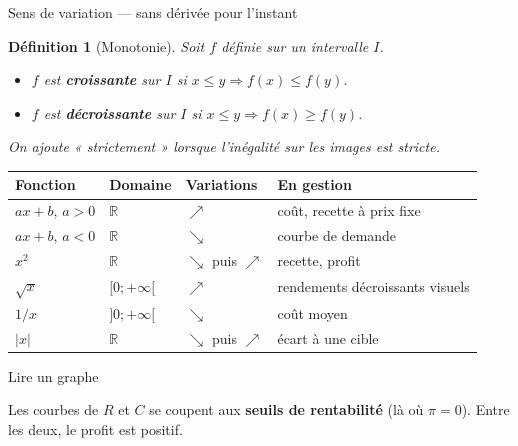 \documentclass[10pt,aspectratio=169]{beamer}
\newcounter{dummy}
\numberwithin{dummy}{section}
\newtheorem{mydef}[dummy]{Définition}
\newcommand{\R}{\mathbb{R}}
\newcommand{\CT}{C}
\newcommand{\Rec}{R}
\newcommand{\Prof}{\pi}
\begin{document}
\begin{frame}{Sens de variation --- sans dérivée pour l'instant}
\begin{mydef}[Monotonie]
Soit $f$ définie sur un intervalle $I$.
\begin{itemize}
    \item $f$ est \textbf{croissante} sur $I$ si $x\leqslant y \Rightarrow f(x)\leqslant f(y)$.
    \item $f$ est \textbf{décroissante} sur $I$ si $x\leqslant y \Rightarrow f(x)\geqslant f(y)$.
\end{itemize}
On ajoute « strictement » lorsque l'inégalité sur les images est stricte.
\end{mydef}

\vspace{0.2em}
\renewcommand{\arraystretch}{1.3}
{\small
\begin{center}
\begin{tabular}{@{}llll@{}}
\toprule
\textbf{Fonction} & \textbf{Domaine} & \textbf{Variations} & \textbf{En gestion} \\
\midrule
$ax+b$, $a>0$ & $\R$ & $\nearrow$ & coût, recette à prix fixe \\
$ax+b$, $a<0$ & $\R$ & $\searrow$ & courbe de demande \\
$x^2$ & $\R$ & $\searrow$ puis $\nearrow$ & recette, profit \\
$\sqrt{x}$ & $[0;+\infty[$ & $\nearrow$ & rendements décroissants visuels \\
$1/x$ & $]0;+\infty[$ & $\searrow$ & coût moyen \\
$|x|$ & $\R$ & $\searrow$ puis $\nearrow$ & écart à une cible \\
\bottomrule
\end{tabular}
\end{center}
}
\end{frame}

\begin{frame}{Lire un graphe}
\centering
{}

\vspace{0.2em}
{\small
Les courbes de $\Rec$ et $\CT$ se coupent aux \textbf{seuils de rentabilité}
(là où $\Prof=0$). Entre les deux, le profit est positif.
}
\end{frame}
\end{document}
